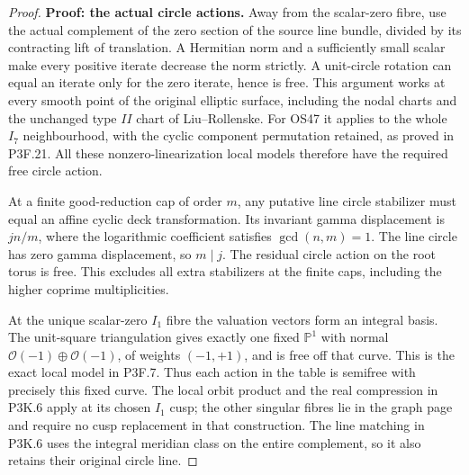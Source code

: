 \begin{proof}
\textbf{Proof: the actual circle actions.} Away from the scalar-zero fibre, use the actual complement of the zero section of the source line bundle, divided by its contracting lift of translation. A Hermitian norm and a sufficiently small scalar make every positive iterate decrease the norm strictly. A unit-circle rotation can equal an iterate only for the zero iterate, hence is free. This argument works at every smooth point of the original elliptic surface, including the nodal charts and the unchanged type \(II\) chart of Liu--Rollenske. For OS47 it applies to the whole \(I_7\) neighbourhood, with the cyclic component permutation retained, as proved in P3F.21. All these nonzero-linearization local models therefore have the required free circle action.

At a finite good-reduction cap of order \(m\), any putative line circle stabilizer must equal an affine cyclic deck transformation. Its invariant gamma displacement is \(jn/m\), where the logarithmic coefficient satisfies \(\gcd(n,m)=1\). The line circle has zero gamma displacement, so \(m\mid j\). The residual circle action on the root torus is free. This excludes all extra stabilizers at the finite caps, including the higher coprime multiplicities.

At the unique scalar-zero \(I_1\) fibre the valuation vectors form an integral basis. The unit-square triangulation gives exactly one fixed \(\mathbb P^1\) with normal \(\mathcal O(-1)\oplus\mathcal O(-1)\), of weights \((-1,+1)\), and is free off that curve. This is the exact local model in P3F.7. Thus each action in the table is semifree with precisely this fixed curve. The local orbit product and the real compression in P3K.6 apply at its chosen \(I_1\) cusp; the other singular fibres lie in the graph page and require no cusp replacement in that construction. The line matching in P3K.6 uses the integral meridian class on the entire complement, so it also retains their original circle line.


\end{proof}
